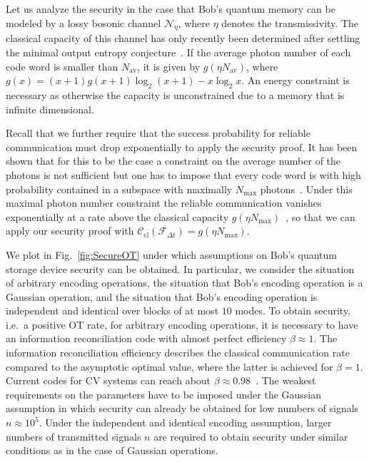 \documentclass[aps,amsfonts,twoside,amssymb,superscriptaddress,twocolumn]{revtex4-1}
\newcommand*{\cC}{\mathcal{C}}
\newcommand*{\cF}{\mathcal{F}}
\newcommand*{\cN}{\mathcal{N}}
\newcommand*{\cl}{\textrm{cl}}
\newcommand*{\av}{\textrm{av}}
\begin{document}
Let us analyze the security in the case that Bob's quantum memory can be modeled by a lossy bosonic channel $\cN_\eta$, where $\eta$ denotes the transmissivity. The classical capacity of this channel has only recently  been determined after settling the minimal output entropy conjecture~\cite{giovannetti2013A,giovannettiB}. If the average photon number of each code word is smaller than $N_\av$, it is given by $g( \eta N_{\av})$, where $g(x) = (x+1)g(x+1) \log_2(x+1) - x\log_2 x$. An energy constraint is necessary as otherwise the capacity is unconstrained due to a memory that is infinite dimensional.
 
Recall that we further require that the success probability for reliable communication must drop exponentially to apply the security proof. It has been shown that for this to be the case a constraint on the average number of the photons is not sufficient but one has to impose that every code word is with high probability contained in a subspace with maximally $N_{\max} $ photons~\cite{wilde2014}. Under this maximal photon number constraint the reliable communication vanishes exponentially at a rate above the classical capacity  $g( \eta N_{\max})$~\cite{wilde2014,bardhan2014,bardhan2014B}, so that we can apply our security proof with $\cC_\cl(\cF_{\Delta t}) =g( \eta N_{\max})$. 

We plot in Fig.~\ref{fig:SecureOT} under which assumptions on Bob's quantum storage device security can be obtained. In particular, we consider the situation of arbitrary encoding operations, the situation that Bob's encoding operation is a Gaussian operation, and the situation that Bob's encoding operation is independent and identical over blocks of at most $10$ modes.
To obtain security, i.e.\ a positive OT rate, for arbitrary encoding operations, it is necessary to have an information reconciliation code with almost perfect efficiency $\beta \approx 1$. The information reconciliation efficiency describes the classical communication rate compared to the asymptotic optimal value, where the latter is achieved for $\beta=1$. Current codes for CV systems can reach about $\beta\approx 0.98$~\cite{jouguet2014high,pacher2016}. The weakest requirements on the parameters have to be imposed under the Gaussian assumption in which security can already be obtained for low numbers of signals $n\approx 10^5$. Under the independent and identical encoding assumption, larger numbers of transmitted signals $n$ are required to obtain security under similar conditions as in the case of Gaussian operations.  
\end{document}
